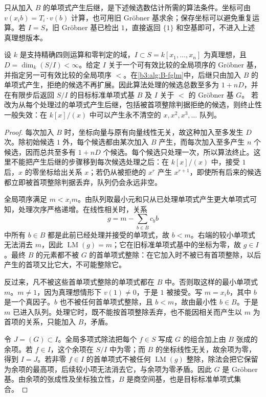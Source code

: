 只从加入 \(B\) 的单项式产生后继，是下述候选数估计所需的算法条件。坐标可由 \(v(x_i b)=T_i\cdot v(b)\) 计算，也可用旧 Gröbner 基求余；保存坐标可以避免重复运算。若 \(I=S\)，旧 Gröbner 基已检出 \(1\)，直接返回 \(\{1\}\) 和空基即可，不进入上述真理想版本。

\begin{theorem}\label{b3:thm:B-fglm}\label{b3:thm:B-fglm-candidate-bound}
	设 \(k\) 是支持精确四则运算和零判定的域，\(I\subset S=k[x_1,\ldots,x_n]\) 为真理想，且 \(D=\dim_k(S/I)<\infty\)。给定 \(I\) 关于一个可有效比较的全局项序的 Gröbner 基，并指定另一可有效比较的全局项序 \(<\)。在\cref{b3:alg:B-fglm}中，后继只由加入 \(B\) 的单项式产生，拒绝的候选不再扩展。因此算法处理的候选总数至多为 \(1+nD\)，并在有限步后返回 \(S/I\) 的目标标准单项式基 \(B\) 及 \(I\) 关于 \(<\) 的 Gröbner 基 \(G\)。 若改为从每个处理过的单项式产生后继，包括被首项整除判据拒绝的候选，则终止性一般失效：在 \(k[x]/(x)\) 中可以产生永不清空的 \(x,x^2,x^3,\ldots\) 队列。
\end{theorem}
\begin{proof}
	每次加入 \(B\) 时，坐标向量与原有向量线性无关，故这种加入至多发生 \(D\) 次。除初始候选 \(1\) 外，每个候选都由某次加入 \(B\) 产生，而每次加入至多产生 \(n\) 个候选，因而总共至多有 \(1+nD\) 个候选。每个候选只处理一次，所以算法终止。这里不能把产生后继的步骤移到每次候选处理之后：在 \(k[x]/(x)\) 中，接受 \(1\) 后，\(x\) 的零坐标给出关系 \(x\)；若仍从被拒绝的 \(x^r\) 产生 \(x^{r+1}\)，即使所有后来的候选都立即被首项整除判据丢弃，队列仍会永远非空。

	全局项序满足 \(m<x_i m\)。由队列取最小元和只从已处理单项式产生更大单项式可知，处理次序严格递增。在线性相关时，关系
	\[
		g=m-\sum_{b\in B}c_bb
	\]
	中所有 \(b\in B\) 都是此前已经处理并接受的单项式，故 \(b<m\)。右端的较小单项式无法消去 \(m\)，因此 \(\operatorname{LM}(g)=m\)；它在旧标准单项式基中的坐标为零，故 \(g\in I\)。最终 \(B\) 的元素都不被 \(G\) 的首单项式整除：在它加入时不被已有首项整除，以后产生的首项又比它大，不可能整除它。

	反过来，凡不被这些首单项式整除的单项式都在 \(B\) 中。否则取这样的最小单项式 \(m\)。\(m\ne1\)，因为真理想情形下 \(v(1)\ne0\)，于是 \(1\) 被接受。写 \(m=x_i b\)，其中 \(b\) 是一个真因子。\(b\) 也不被任何首单项式整除，且 \(b<m\)，故由最小性 \(b\in B\)。于是 \(m\) 已进入队列。处理它时，既不能按首项整除丢弃，也不能因相关而产生以 \(m\) 为首项的关系，只能加入 \(B\)，矛盾。

	令 \(J=(G)\subset I\)。全局多项式除法把每个 \(f\in S\) 写成 \(G\) 的组合加上由 \(B\) 张成的余项。若 \(f\in I\)，这个余项在 \(S/I\) 中为零；而 \(B\) 的坐标线性无关，故余项为零，得到 \(I=J\)。若非零 \(f\in I\) 的首单项式不被任何 \(\operatorname{LM}(g)\) 整除，除法会把它保留为余项的最高项，后续较小项无法消去它，与余项为零矛盾。因此 \(G\) 是 Gröbner 基。由余项的张成性及坐标独立性，\(B\) 是商空间基，也是目标标准单项式集合。
\end{proof}


